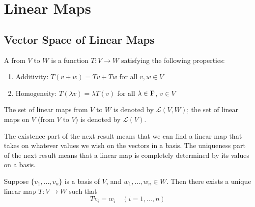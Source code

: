 \chapter{Linear Maps}\label{chap:linear-maps}
\section{Vector Space of Linear Maps}
\begin{definition}
A  from $V$ to $W$ is a function $T:V\to W$ satisfying the following properties:
\begin{enumerate}[label=(\roman*)]
\item Additivity: $T(v+w)=Tv+Tw$ for all $v,w\in V$
\item Homogeneity: $T(\lambda v)=\lambda T(v)$ for all $\lambda\in\mathbf F$, $v\in V$
\end{enumerate}
\end{definition}

\begin{notation}
The set of linear maps from $V$ to $W$ is denoted by $\mathcal{L}(V,W)$; the set of linear maps on $V$ (from $V$ to $V$) is denoted by $\mathcal{L}(V)$.
\end{notation}

The existence part of the next result means that we can find a linear map that takes on whatever values we wish on the vectors in a basis. The uniqueness part of the next result means that a linear map is completely determined by its values on a basis.

\begin{lemma}
Suppose $\{v_1,\dots,v_n\}$ is a basis of $V$, and $w_1,\dots,w_n\in W$. Then there exists a unique linear map $T:V\to W$ such that
\[Tv_i=w_i\quad(i=1,\dots,n)\]
\end{lemma}

